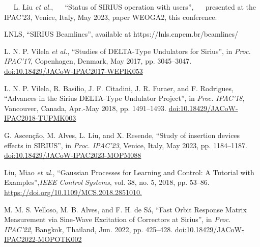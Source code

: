 \documentclass[a4paper,
               keeplastbox,   %
               ]{jacow}
\begin{document}
	\begin{thebibliography}{14} %

   L. Liu \emph{et al.},
   \textquotedblleft{Status of SIRIUS operation with users}\textquotedblright,
   presented at the IPAC’23, Venice, Italy, May 2023, paper WEOGA2, this conference.   
    


        LNLS,
        \textquotedblleft{SIRIUS Beamlines}\textquotedblright,
        available at https://lnls.cnpem.br/beamlines/

        L. N. P. Vilela \emph{et al.},
        \textquotedblleft{Studies of DELTA-Type Undulators for Sirius}\textquotedblright,
        in \emph{Proc. IPAC’17}, Copenhagen, Denmark, May 2017, pp. 3045--3047.
        \url{doi:10.18429/JACoW-IPAC2017-WEPIK053} 
    
   L. N. P. Vilela, R. Basilio, J. F. Citadini, J. R. Furaer, and F. Rodrigues,
   \textquotedblleft{Advances in the Sirius DELTA-Type Undulator Project}\textquotedblright,
   in \emph{Proc. IPAC’18}, Vancouver, Canada, Apr.-May 2018, pp. 1491--1493.
   \url{doi:10.18429/JACoW-IPAC2018-TUPMK003}  

   G. Ascenção, M. Alves, L. Liu, and X. Resende,
   \textquotedblleft{Study of insertion devices effects in SIRIUS}\textquotedblright,
   in \emph{Proc. IPAC’23}, Venice, Italy, May 2023, pp. 1184--1187.
   \url{doi:10.18429/JACoW-IPAC2023-MOPM088}    

    Liu, Miao \emph{et al.},  
    \textquotedblleft{Gaussian Processes for Learning and Control: A Tutorial with Examples}\textquotedblright,\emph{IEEE Control Systems}, vol. 38, no. 5, 2018, pp. 53–86.
    \url{https://doi.org/10.1109/MCS.2018.2851010. }

   M. M. S. Velloso, M. B. Alves, and F. H. de Sá,
   \textquotedblleft{Fast Orbit Response Matrix Measurement via Sine-Wave Excitation of Correctors at Sirius}\textquotedblright,
   in \emph{Proc. IPAC’22}, Bangkok, Thailand, Jun. 2022, pp. 425--428.
   \url{doi:10.18429/JACoW-IPAC2022-MOPOTK002}  
   

\end{thebibliography}
\end{document}
